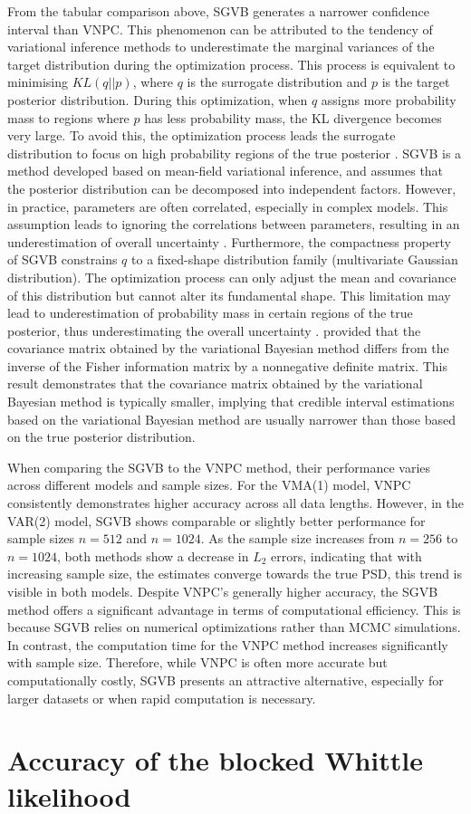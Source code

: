 \documentclass[%
 reprint,
 amsmath,amssymb,
 aps,
]{revtex4-2}
\begin{document}
From the tabular comparison above, SGVB generates a narrower confidence interval than VNPC. This phenomenon can be attributed to the tendency of variational inference methods to underestimate the marginal variances of the target distribution during the optimization process. This process is equivalent to minimising $KL(q||p)$, where $q$ is the surrogate distribution and $p$ is the target posterior distribution. During this optimization, when $q$ assigns more probability mass to regions where $p$ has less probability mass, the KL divergence becomes very large. To avoid this, the optimization process leads the surrogate distribution to focus on high probability regions of the true posterior \cite{Blei2017}. SGVB is a method developed based on mean-field variational inference, and assumes that the posterior distribution can be decomposed into independent factors. However, in practice, parameters are often correlated, especially in complex models. This assumption leads to ignoring the correlations between parameters, resulting in an underestimation of overall uncertainty \cite{Blei2006}. Furthermore, the compactness property of SGVB constrains $q$ to a fixed-shape distribution family (multivariate Gaussian distribution). The optimization process can only adjust the mean and covariance of this distribution but cannot alter its fundamental shape. This limitation may lead to underestimation of probability mass in certain regions of the true posterior, thus underestimating the overall uncertainty \cite{Turner2011}. \cite{Wang2005} provided that the covariance matrix obtained by the variational Bayesian method differs from the inverse of the Fisher information matrix by a nonnegative definite matrix. This result demonstrates that the covariance matrix obtained by the variational Bayesian method is typically smaller, implying that credible interval estimations based on the variational Bayesian method are usually narrower than those based on the true posterior distribution.


When comparing the SGVB to the VNPC method, their performance varies across different models and sample sizes. For the VMA(1) model, VNPC consistently demonstrates higher accuracy across all data lengths. However, in the VAR(2) model, SGVB shows comparable or slightly better performance for sample sizes $n=512$ and $n=1024$. As the sample size increases from $n=256$ to $n=1024$, both methods show a decrease in $L_2$ errors, indicating that with increasing sample size, the estimates converge towards the true PSD, this trend is visible in both models. Despite VNPC's generally higher accuracy, the SGVB method offers a significant advantage in terms of computational efficiency. This is because SGVB relies on numerical optimizations rather than MCMC simulations. In contrast, the computation time for the VNPC method increases significantly with sample size. Therefore, while VNPC is often more accurate but computationally costly, SGVB presents an attractive alternative, especially for larger datasets or when rapid computation is necessary.





\section{Accuracy of the blocked  Whittle likelihood}
\label{sec:accuracy}
\end{document}
